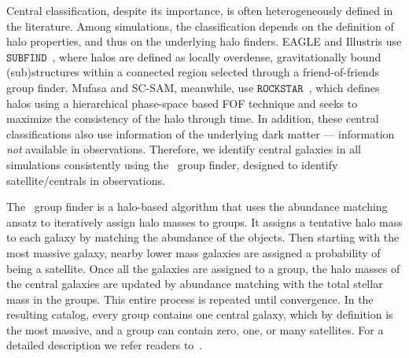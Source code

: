 \documentclass[tighten, preprint]{aastex62}
\begin{document}
Central classification, despite its importance, is often 
heterogeneously defined in the literature. Among simulations, the 
classification depends on the definition of halo properties, 
and thus on the underlying halo finders. EAGLE and Illustris use 
$\mathtt{SUBFIND}$~\citep{springel2001}, where halos are defined as 
locally overdense, gravitationally bound (sub)structures within a 
connected region selected through a 
friend-of-friends~\citep[FOF;][]{davis1985} group finder. {\sc Mufasa} 
and SC-SAM, meanwhile, use 
$\mathtt{ROCKSTAR}$~\citep{behroozi2013}, which defines halos using a
hierarchical phase-space based FOF technique and seeks to maximize 
the consistency of the halo through time. In addition, these central 
classifications also use information of the underlying dark 
matter --- information {\em not} available in observations. Therefore, 
we identify central galaxies in all simulations consistently using %
the~\cite{tinker2011} group finder, designed to identify satellite/centrals 
in observations. 

The~\cite{tinker2011} group finder is a halo-based algorithm that uses 
the abundance matching ansatz to iteratively assign halo masses to groups. 
It assigns a tentative halo mass to each galaxy by matching the abundance 
of the objects. Then starting with the most massive galaxy, nearby lower
mass galaxies are assigned a probability of being a satellite. Once all 
the galaxies are assigned to a group, the halo masses of the central galaxies 
are updated by abundance matching with the total stellar mass in the groups. 
This entire process is repeated until convergence. In the resulting catalog, 
every group contains one central galaxy, which by definition is the 
most massive, and a group can contain zero, one, or many satellites.
For a detailed description we refer readers to~\cite{tinker2011,wetzel2012}. 
\end{document}
